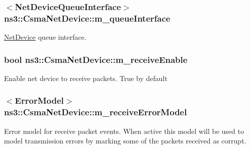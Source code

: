 \subsubsection[{\texorpdfstring{m\+\_\+queue\+Interface}{m_queueInterface}}]{$<${\bf Net\+Device\+Queue\+Interface}$>$ ns3\+::\+Csma\+Net\+Device\+::m\+\_\+queue\+Interface\hspace{0.3cm}{\ttfamily [private]}}\hypertarget{classns3_1_1CsmaNetDevice_a93a7be08d44dbabfdf111e90feb7c72a}{}\label{classns3_1_1CsmaNetDevice_a93a7be08d44dbabfdf111e90feb7c72a}
\hyperlink{classns3_1_1NetDevice}{Net\+Device} queue interface. 
\subsubsection[{\texorpdfstring{m\+\_\+receive\+Enable}{m_receiveEnable}}]{\setlength{\rightskip}{0pt plus 5cm}bool ns3\+::\+Csma\+Net\+Device\+::m\+\_\+receive\+Enable\hspace{0.3cm}{\ttfamily [private]}}\hypertarget{classns3_1_1CsmaNetDevice_a8d844dcce78846a16c9a52c752f9736f}{}\label{classns3_1_1CsmaNetDevice_a8d844dcce78846a16c9a52c752f9736f}
Enable net device to receive packets. True by default 
\subsubsection[{\texorpdfstring{m\+\_\+receive\+Error\+Model}{m_receiveErrorModel}}]{$<${\bf Error\+Model}$>$ ns3\+::\+Csma\+Net\+Device\+::m\+\_\+receive\+Error\+Model\hspace{0.3cm}{\ttfamily [private]}}\hypertarget{classns3_1_1CsmaNetDevice_aeef9196f9c7c46c99a7f703dc46c0207}{}\label{classns3_1_1CsmaNetDevice_aeef9196f9c7c46c99a7f703dc46c0207}
Error model for receive packet events. When active this model will be used to model transmission errors by marking some of the packets received as corrupt. 
